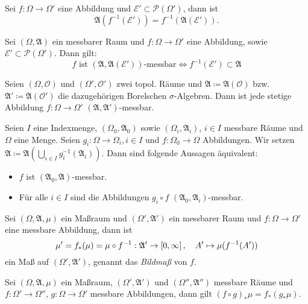 \documentclass{cheat-sheet}
\newcommand{\Alg}{\mathfrak{A}} %
\theoremstyle{definition}
\begin{document}
\begin{satz}
  Sei $f : \Omega \to \Omega'$ eine Abbildung und $\mathcal{E}' \subset \mathcal{P}(\Omega')$, dann ist
  \[ \Alg(f^{-1}(\mathcal{E}')) = f^{-1}(\Alg(\mathcal{E}')). \]
\end{satz}

\begin{satz}
  Sei $(\Omega, \Alg)$ ein messbarer Raum und $f : \Omega \to \Omega'$ eine Abbildung, sowie $\mathcal{E'} \subset \mathcal{P}(\Omega')$. Dann gilt:
  \[ f \text{ ist } (\Alg, \Alg(\mathcal{E}')) \text{-messbar} \iff f^{-1}(\mathcal{E}') \subset \Alg \]
\end{satz}

\begin{satz}
  Seien $(\Omega, \mathcal{O})$ und $(\Omega', \mathcal{O}')$ zwei topol. Räume und $\Alg \coloneqq \Alg(\mathcal{O})$ bzw. $\Alg' \coloneqq \Alg(\mathcal{O}')$ die dazugehörigen Borelschen $\sigma$-Algebren. Dann ist jede stetige Abbildung $f : \Omega \to \Omega'$ $(\Alg, \Alg')$-messbar.
\end{satz}


\begin{satz}[Projektionssatz]
  Seien $I$ eine Indexmenge, $(\Omega_0, \Alg_0)$ sowie $(\Omega_i, \Alg_i)$, $i \in I$ messbare Räume und $\Omega$ eine Menge. Seien $g_i : \Omega \to \Omega_i, i \in I$ und $f : \Omega_0 \to \Omega$ Abbildungen. Wir setzen $\Alg \coloneqq \Alg\left( \bigcup_{i \in I} g_i^{-1}(\Alg_i) \right)$. Dann sind folgende Aussagen äquivalent:
  \begin{itemize}
    \item $f$ ist $(\Alg_0, \Alg)$-messbar.
    \item Für alle $i \in I$ sind die Abbildungen $g_i \circ f$ $(\Alg_0, \Alg_i)$-messbar.
  \end{itemize}
\end{satz}

\begin{satz}
  Sei $(\Omega, \Alg, \mu)$ ein Maßraum und $(\Omega', \Alg')$ ein messbarer Raum und $f : \Omega \to \Omega'$ eine messbare Abbildung, dann ist
  \[ \mu' = f_*(\mu) = \mu \circ f^{-1} : \Alg' \to \cinterval{0}{\infty}, \quad A' \mapsto \mu(f^{-1}(A')) \]
  ein Maß auf $(\Omega', \Alg')$, genannt das \emph{Bildmaß} von $f$.
\end{satz}

\begin{bem}
  Sei $(\Omega, \Alg, \mu)$ ein Maßraum, $(\Omega', \Alg')$ und $(\Omega'', \Alg'')$ messbare Räume und $f : \Omega' \to \Omega''$, $g : \Omega \to \Omega'$ messbare Abbildungen, dann gilt $(f \circ g)_* \mu = f_*(g_* \mu)$.
\end{bem}
\end{document}
